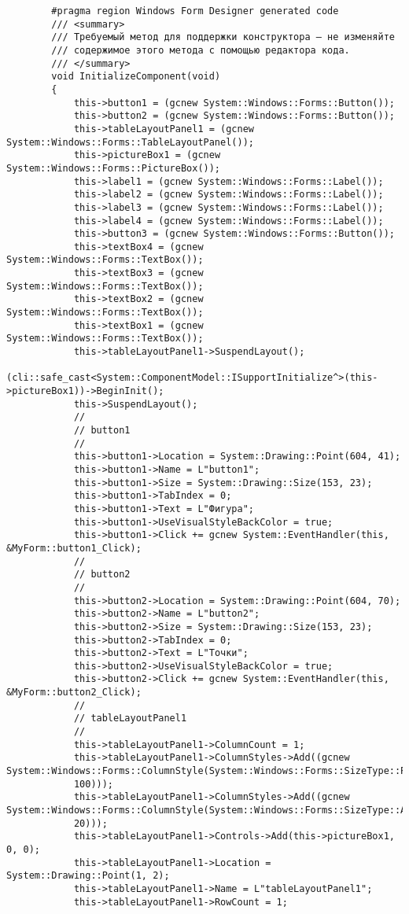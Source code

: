 \documentclass[a4paper,12pt]{article}
\begin{document}
\begin{verbatim}
		#pragma region Windows Form Designer generated code
		/// <summary>
		/// Требуемый метод для поддержки конструктора — не изменяйте 
		/// содержимое этого метода с помощью редактора кода.
		/// </summary>
		void InitializeComponent(void)
		{
			this->button1 = (gcnew System::Windows::Forms::Button());
			this->button2 = (gcnew System::Windows::Forms::Button());
			this->tableLayoutPanel1 = (gcnew System::Windows::Forms::TableLayoutPanel());
			this->pictureBox1 = (gcnew System::Windows::Forms::PictureBox());
			this->label1 = (gcnew System::Windows::Forms::Label());
			this->label2 = (gcnew System::Windows::Forms::Label());
			this->label3 = (gcnew System::Windows::Forms::Label());
			this->label4 = (gcnew System::Windows::Forms::Label());
			this->button3 = (gcnew System::Windows::Forms::Button());
			this->textBox4 = (gcnew System::Windows::Forms::TextBox());
			this->textBox3 = (gcnew System::Windows::Forms::TextBox());
			this->textBox2 = (gcnew System::Windows::Forms::TextBox());
			this->textBox1 = (gcnew System::Windows::Forms::TextBox());
			this->tableLayoutPanel1->SuspendLayout();
			(cli::safe_cast<System::ComponentModel::ISupportInitialize^>(this->pictureBox1))->BeginInit();
			this->SuspendLayout();
			// 
			// button1
			// 
			this->button1->Location = System::Drawing::Point(604, 41);
			this->button1->Name = L"button1";
			this->button1->Size = System::Drawing::Size(153, 23);
			this->button1->TabIndex = 0;
			this->button1->Text = L"Фигура";
			this->button1->UseVisualStyleBackColor = true;
			this->button1->Click += gcnew System::EventHandler(this, &MyForm::button1_Click);
			// 
			// button2
			// 
			this->button2->Location = System::Drawing::Point(604, 70);
			this->button2->Name = L"button2";
			this->button2->Size = System::Drawing::Size(153, 23);
			this->button2->TabIndex = 0;
			this->button2->Text = L"Точки";
			this->button2->UseVisualStyleBackColor = true;
			this->button2->Click += gcnew System::EventHandler(this, &MyForm::button2_Click);
			// 
			// tableLayoutPanel1
			// 
			this->tableLayoutPanel1->ColumnCount = 1;
			this->tableLayoutPanel1->ColumnStyles->Add((gcnew System::Windows::Forms::ColumnStyle(System::Windows::Forms::SizeType::Percent,
			100)));
			this->tableLayoutPanel1->ColumnStyles->Add((gcnew System::Windows::Forms::ColumnStyle(System::Windows::Forms::SizeType::Absolute,
			20)));
			this->tableLayoutPanel1->Controls->Add(this->pictureBox1, 0, 0);
			this->tableLayoutPanel1->Location = System::Drawing::Point(1, 2);
			this->tableLayoutPanel1->Name = L"tableLayoutPanel1";
			this->tableLayoutPanel1->RowCount = 1;

\end{verbatim}
\end{document}
